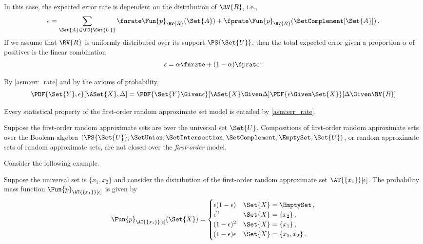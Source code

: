 \documentclass[ ../main.tex]{subfiles}
\begin{document}
In this case, the expected error rate is dependent on the distribution of $\RV{R}$, i.e.,
\begin{equation}
	\epsilon = \sum_{\Set{A} \in \PS{\Set{U}}} \fnrate \Fun{p}_{\RV{R}}(\Set{A}) + \fprate \Fun{p}_{\RV{R}}(\SetComplement[\Set{A}])\,.
\end{equation}
If we assume that $\RV{R}$ is uniformly distributed over its support $\PS{\Set{U}}$, then the total expected error given a proportion $\alpha$ of positives is the linear combination
\begin{equation}
	\epsilon = \alpha \fnrate + (1-\alpha) \fprate\,.
\end{equation}

By \cref{asm:err_rate} and by the axioms of probability,
\begin{equation}
\PDF{\Set{Y},\epsilon}[\ASet{X}, \Delta] =
\PDF{\Set{Y} \Given \epsilon}[\ASet{X} \Given \Delta]
\PDF{\epsilon \Given \Set{X}}[\Delta \Given \RV{R}]
\end{equation}

Every statistical property of the first-order random approximate set model is entailed by \cref{asm:err_rate}.

Suppose the first-order random approximate sets are over the universal set $\Set{U}$.
Compositions of first-order random approximate sets over the Boolean algebra $(\PS{\Set{U}},\SetUnion,\SetIntersection,\SetComplement,\EmptySet,\Set{U})$, or random approximate sets of random approximate sets, are not closed over the \emph{first-order} model.


Consider the following example.
\begin{example}
	Suppose the universal set is $\{ x_1,x_2 \}$ and consider the distribution of the first-order random approximate set $\AT{\{x_1\}}[\epsilon]$.
	The probability mass function $\Fun{p}_{\AT{\{x_1\}}[\epsilon]}$ is given by
	\begin{equation}
	\Fun{p}_{\AT{\{x_1\}}[\epsilon]}(\Set{X}) =
	\begin{cases} 
	\epsilon (1-\epsilon) 	& \Set{X} = \EmptySet\,,\\
	\epsilon^2     			& \Set{X} = \{x_2\}\,,\\
	(1-\epsilon)^2     & \Set{X} = \{x_1\}\,,\\
	(1-\epsilon) \epsilon         & \Set{X} = \{x_1,x_2\}\,.
	\end{cases}
	\end{equation}
\end{example}
\end{document}
